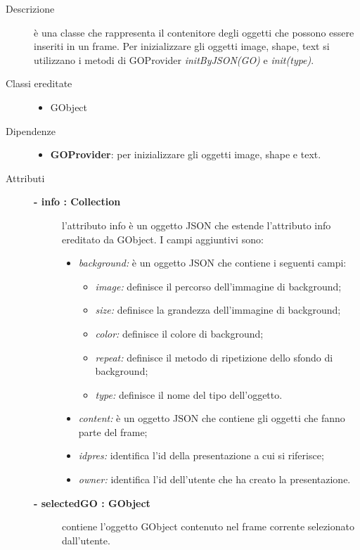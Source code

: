 \begin{description}
\item[Descrizione] \hfill
	è una classe che rappresenta il contenitore degli oggetti che possono essere inseriti in un frame. Per inizializzare gli oggetti image, shape, text si utilizzano i metodi di GOProvider \textit{initByJSON(GO)} e \textit{init(type)}. 
	
	\item[Classi ereditate] \hfill
	\begin{itemize}
		\item GObject
	\end{itemize}
	
	\item[Dipendenze] \hfill
	\begin{itemize}
		\item \textbf{GOProvider}: per inizializzare gli oggetti image, shape e text.
	\end{itemize}
	
\item[Attributi] \hfill
	\begin{description}
		\item[\textbf{- info : Collection			}] \hfill
			l'attributo info è un oggetto JSON che estende l'attributo info ereditato da GObject. I campi aggiuntivi sono:
	\begin{itemize}
		\item \textit{background:} è un oggetto JSON che contiene i seguenti campi:
		\begin{itemize}
			\item \textit{image:} definisce il percorso dell'immagine di background;
			\item \textit{size:} definisce la grandezza dell'immagine di background;
			\item \textit{color:} definisce il colore di background;
			\item \textit{repeat:} definisce il metodo di ripetizione dello sfondo di background;
			\item \textit{type:} definisce il nome del tipo dell'oggetto.
		\end{itemize}		
		\item \textit{content:} è un oggetto JSON che contiene gli oggetti che fanno parte del frame;
		\item \textit{idpres:} identifica l'id della presentazione a cui si riferisce;
		\item \textit{owner:} identifica l'id dell'utente che ha creato la presentazione.
	\end{itemize}
	\end{description}
	\begin{description}
		\item[\textbf{- selectedGO : GObject			}] \hfill
			contiene l'oggetto GObject contenuto nel frame corrente selezionato dall'utente.  
	\end{description}
	

\end{description}
